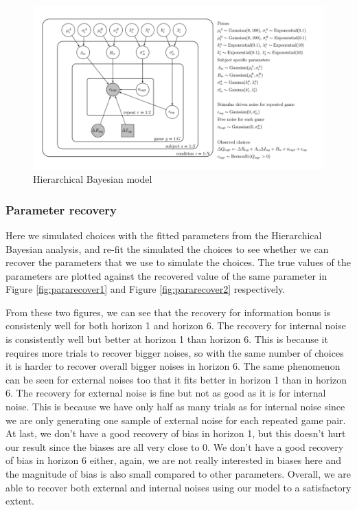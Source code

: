 \documentclass[12pt]{article}
\begin{document}
	\begin{figure}[H]
		\begin{center}
			\includegraphics[width=\textwidth]{figures/hbm.pdf}
			\caption{Hierarchical Bayesian model}
			\label{fig:model}
		\end{center}
	\end{figure}
	
	\subsubsection*{Parameter recovery\label{ch:appendix:bayesrecovery}}
	
	Here we simulated choices with the fitted parameters from the Hierarchical Bayesian analysis, and re-fit the simulated the choices to see whether we can recover the parameters that we use to simulate the choices. The true values of the parameters are plotted against the recovered value of the same parameter in Figure \ref{fig:pararecover1} and Figure \ref{fig:pararecover2} respectively.
	
	From these two figures, we can see that the recovery for information bonus is consistenly well for both horizon 1 and horizon 6. The recovery for internal noise is consistently well but better at horizon 1 than horizon 6. This is because it requires more trials to recover bigger noises, so with the same number of choices it is harder to recover overall bigger noises in horizon 6. The same phenomenon can be seen for external noises too that it fits better in horizon 1 than in horizon 6. The recovery for external noise is fine but not as good as it is for internal noise. This is because we have only half as many trials as for internal noise since we are only generating one sample of external noise for each repeated game pair. At last, we don't have a good recovery of bias in horizon 1, but this doesn't hurt our result since the biases are all very close to 0. We don't have a good recovery of bias in horizon 6 either, again, we are not really interested in biases here and the magnitude of bias is also small compared to other parameters. Overall, we are able to recover both external and internal noises using our model to a satisfactory extent.
	
\end{document}
